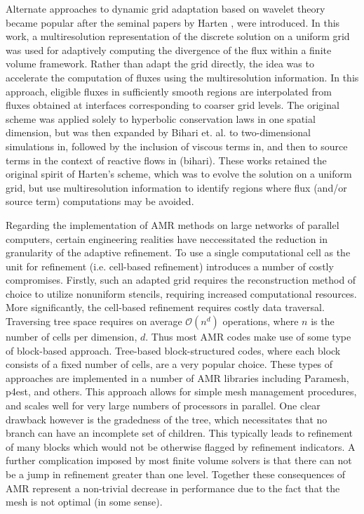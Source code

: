 \documentclass[review]{elsarticle}
\begin{document}
    Alternate approaches to dynamic grid adaptation based on wavelet theory
    became popular after the seminal papers by Harten \cite{harten1994}, were
    introduced. In this work, a multiresolution representation of the discrete
    solution on a uniform grid was used for adaptively computing the divergence
    of the flux within a finite volume framework. Rather than adapt the grid
    directly, the idea was to accelerate the computation of fluxes using the
    multiresolution information. In this approach, eligible fluxes in
    sufficiently smooth regions are interpolated from fluxes obtained at
    interfaces corresponding to coarser grid levels. The original scheme was
    applied solely to hyperbolic conservation laws in one spatial dimension,
    but was then expanded by Bihari et. al. to two-dimensional simulations in,
    followed by the inclusion of viscous terms in, and then to source terms in
    the context of reactive flows in (bihari). These works retained the
    original spirit of Harten's scheme, which was to evolve the solution on a
    uniform grid, but use multiresolution information to identify regions where
    flux (and/or source term) computations may be avoided.

    Regarding the implementation of AMR methods on large networks of parallel
    computers, certain engineering realities have neccessitated the reduction in
    granularity of the adaptive refinement. To use a single computational cell
    as the unit for refinement (i.e. cell-based refinement) introduces a number
    of costly compromises. Firstly, such an adapted grid requires the
    reconstruction method of choice to utilize nonuniform stencils, requiring
    increased computational resources. More significantly, the cell-based
    refinement requires costly data traversal. Traversing tree space requires on
    average $\mathcal{O}(n^d)$ operations, where $n$ is the
    number of cells per dimension, $d$. Thus most AMR codes make use of some
    type of block-based approach. Tree-based block-structured codes, where each
    block consists of a fixed number of cells, are a very popular choice. These
    types of approaches are implemented in a number of AMR libraries including
    Paramesh, p4est, and others. This approach allows for
    simple mesh management procedures, and scales well for very large numbers of
    processors in parallel.  One clear drawback however is the gradedness of the
    tree, which necessitates that no branch can have an incomplete set of
    children. This typically leads to refinement of many blocks which would not
    be otherwise flagged by refinement indicators. A further complication
    imposed by most finite volume solvers is that there can not be a jump in
    refinement greater than one level. Together these consequences of AMR
    represent a non-trivial decrease in performance due to the fact that the
    mesh is not optimal (in some sense).
\end{document}
